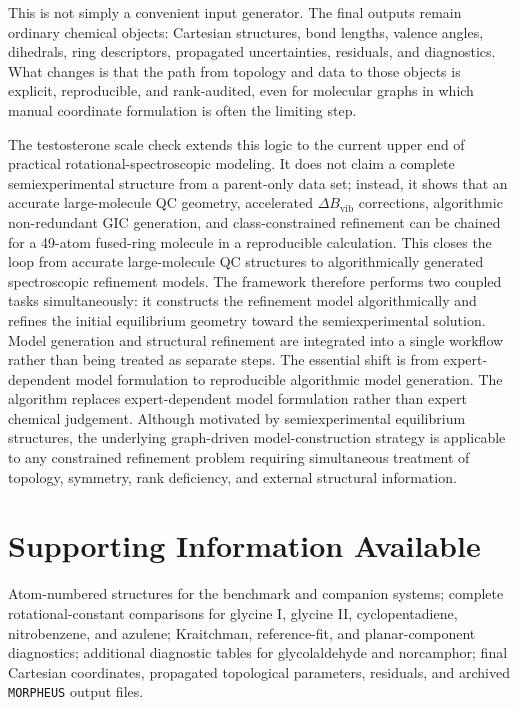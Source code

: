 \documentclass[aip,jcp,reprint,longbibliography,floatfix]{revtex4-2}
\begin{document}
This is not simply a convenient input generator. The final outputs remain
ordinary chemical objects: Cartesian structures, bond lengths, valence angles,
dihedrals, ring descriptors, propagated uncertainties, residuals, and
diagnostics. What changes is that the path from topology and data to those
objects is explicit, reproducible, and rank-audited, even for molecular graphs
in which manual coordinate formulation is often the limiting step.

The testosterone scale check extends this logic to the current upper end of
practical rotational-spectroscopic modeling. It does not claim a complete
semiexperimental structure from a parent-only data set; instead, it shows that
an accurate large-molecule QC geometry, accelerated $\Delta B_\mathrm{vib}$
corrections, algorithmic non-redundant GIC generation, and class-constrained
refinement can be chained for a 49-atom fused-ring molecule in a
reproducible calculation. This closes the loop from accurate
large-molecule QC structures to algorithmically generated spectroscopic
refinement models.
The framework therefore performs two coupled tasks simultaneously: it
constructs the refinement model algorithmically and refines the initial
equilibrium geometry toward the semiexperimental solution. Model generation
and structural refinement are integrated into a single workflow rather than
being treated as separate steps.
The essential shift is from expert-dependent model formulation to reproducible
algorithmic model generation. The algorithm replaces expert-dependent model
formulation rather than expert chemical judgement.
Although motivated by semiexperimental equilibrium structures, the underlying
graph-driven model-construction strategy is applicable to any constrained
refinement problem requiring simultaneous treatment of topology, symmetry, rank
deficiency, and external structural information.

\section*{Supporting Information Available}

Atom-numbered structures for the benchmark and companion systems; complete
rotational-constant comparisons for glycine I, glycine II, cyclopentadiene,
nitrobenzene, and azulene; Kraitchman, reference-fit, and planar-component
diagnostics; additional diagnostic tables for glycolaldehyde and norcamphor;
final Cartesian coordinates, propagated topological parameters, residuals, and
archived \texttt{MORPHEUS} output files.




\end{document}
